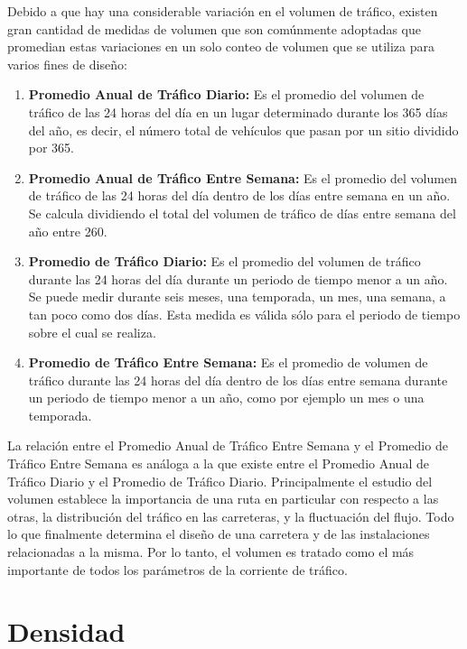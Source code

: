 Debido a que hay una considerable variación en el volumen de tráfico, existen gran cantidad de medidas de volumen que son comúnmente adoptadas que promedian estas variaciones en un solo conteo de volumen que se utiliza para varios fines de diseño:
\begin{enumerate}
\item \textbf{Promedio Anual de Tráfico Diario:} Es el promedio del volumen de tráfico de las 24 horas del día en un lugar determinado durante los 365 días del año, es decir, el número total de vehículos que pasan por un sitio dividido por 365.

\item \textbf{Promedio Anual de Tráfico Entre Semana:} Es el promedio del volumen de tráfico de las 24 horas del día dentro de los días entre semana en un año. Se calcula dividiendo el total del volumen de tráfico de días entre semana del año entre 260.

\item \textbf{Promedio de Tráfico Diario:} Es el promedio del volumen de tráfico durante las 24 horas del día durante un periodo de tiempo menor a un año. Se puede medir durante seis meses, una temporada, un mes, una semana, a tan poco como dos días. Esta medida es válida sólo para el periodo de tiempo sobre el cual se realiza.

\item \textbf{Promedio de Tráfico Entre Semana:} Es el promedio de volumen de tráfico durante las 24 horas del día dentro de los días entre semana durante un periodo de tiempo menor a un año, como por ejemplo un mes o una temporada.
\end{enumerate}
La relación entre el Promedio Anual de Tráfico Entre Semana y el Promedio de Tráfico Entre Semana es análoga a la que existe entre el Promedio Anual de Tráfico Diario y el Promedio de Tráfico Diario. Principalmente el estudio del volumen establece la importancia de una ruta en particular con respecto a las otras, la distribución del tráfico en las carreteras, y la fluctuación del flujo. Todo lo que finalmente determina el diseño de una carretera y de las instalaciones relacionadas a la misma. Por lo tanto, el volumen es tratado como el más importante de todos los parámetros de la corriente de tráfico.

\section{Densidad}

